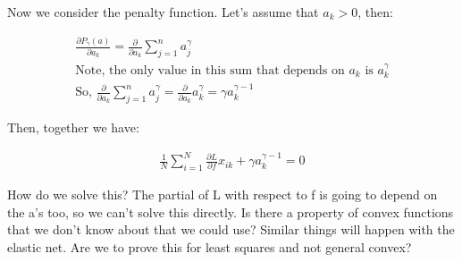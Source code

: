 \documentclass[11pt]{article}
\begin{document}
\vspace{5mm}
\noindent
Now we consider the penalty function. Let's assume that $a_{k} > 0$, then:

\begin{gather*}
\frac{\partial P_{\gamma} (a)}{\partial a_{k}} = 
\frac{\partial}{\partial a_{k}} \sum_{j = 1}^{n} a_{j}^{\gamma}\\
\text{Note, the only value in this sum that depends on } a_{k} 
\text{ is } a_{k}^{\gamma}\\
\text{So, } \frac{\partial}{\partial a_{k}} \sum_{j = 1}^{n} a_{j}^{\gamma} = 
\frac{\partial}{\partial a_{k}} a_{k}^{\gamma} = 
\gamma a_{k}^{\gamma - 1}
\end{gather*}

\vspace{5mm}
\noindent
Then, together we have:

\begin{gather*}
\frac{1}{N} \sum_{i = 1}^{N} \frac{\partial L}{\partial f} x_{ik} + 
\gamma a_{k}^{\gamma - 1} = 0
\end{gather*}

\vspace{5mm}
\noindent
How do we solve this? The partial of L with respect to f is going to depend on 
the a's too, so we can't solve this directly. Is there a property of convex 
functions that we don't know about that we could use? Similar things will 
happen with the elastic net. Are we to prove this for least squares and not 
general convex?
\end{document}

